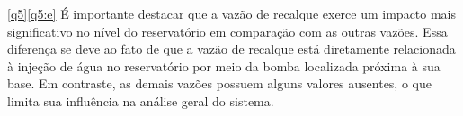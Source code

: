 \eqref{q5}\ref{q5:e} É importante destacar que a vazão de recalque exerce um impacto mais significativo no nível do reservatório em comparação com as outras vazões. Essa diferença se deve ao fato de que a vazão de recalque está diretamente relacionada à injeção de água no reservatório por meio da bomba localizada próxima à sua base. Em contraste, as demais vazões possuem alguns valores ausentes, o que limita sua influência na análise geral do sistema.







